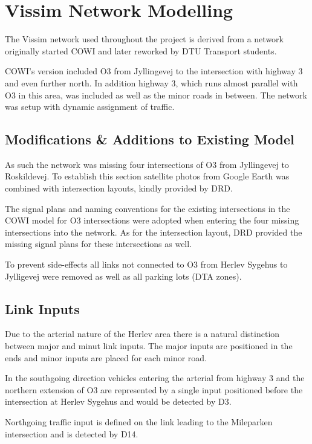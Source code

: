 \section{Vissim Network Modelling}
\label{modelling}
The Vissim network used throughout the project is derived from a network originally started COWI and later reworked by DTU Transport students.

COWI's version included O3 from Jyllingevej to the intersection with highway 3 and even further north. In addition highway 3, which runs almost parallel with O3 in this area, was included as well as the minor roads in between.
The network was setup with dynamic assignment of traffic.

\subsection{Modifications \& Additions to Existing Model}

As such the network was missing four intersections of O3 from Jyllingevej to Roskildevej. To establish this section satellite photos from Google Earth was combined with intersection layouts, kindly provided by DRD.

The signal plans and naming conventions for the existing intersections in the COWI model for O3 intersections were adopted when entering the four missing intersections into the network. As for the intersection layout, DRD provided the missing signal plans for these intersections as well.

To prevent side-effects all links not connected to O3 from Herlev Sygehus to Jylligevej were removed as well as all parking lots (DTA zones).

\subsection{Link Inputs}

Due to the arterial nature of the Herlev area there is a natural distinction between major and minut link inputs. The major inputs are positioned in the ends and minor inputs are placed for each minor road.

In the southgoing direction vehicles entering the arterial from highway 3 and the northern extension of O3 are represented by a single input positioned before the intersection at Herlev Sygehus and would be detected by D3.

Northgoing traffic input is defined on the link leading to the Mileparken intersection and is detected by D14. 

